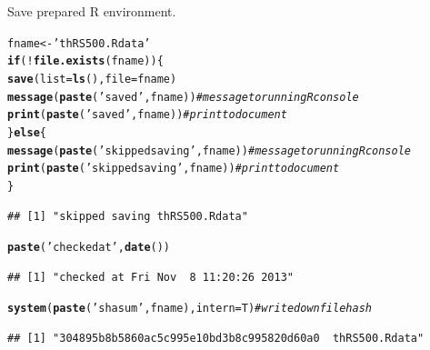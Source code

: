\documentclass{article}\usepackage[]{graphicx}\usepackage[]{color}
\makeatletter
\newcommand{\hlstr}[1]{\textcolor[rgb]{0.192,0.494,0.8}{#1}}%
\newcommand{\hlcom}[1]{\textcolor[rgb]{0.678,0.584,0.686}{\textit{#1}}}%
\newcommand{\hlopt}[1]{\textcolor[rgb]{0,0,0}{#1}}%
\newcommand{\hlstd}[1]{\textcolor[rgb]{0.345,0.345,0.345}{#1}}%
\newcommand{\hlkwa}[1]{\textcolor[rgb]{0.161,0.373,0.58}{\textbf{#1}}}%
\newcommand{\hlkwb}[1]{\textcolor[rgb]{0.69,0.353,0.396}{#1}}%
\newcommand{\hlkwc}[1]{\textcolor[rgb]{0.333,0.667,0.333}{#1}}%
\newcommand{\hlkwd}[1]{\textcolor[rgb]{0.737,0.353,0.396}{\textbf{#1}}}%
\newenvironment{kframe}{%
 \def\at@end@of@kframe{}%
 \ifinner\ifhmode%
  \def\at@end@of@kframe{\end{minipage}}%
  \begin{minipage}{\columnwidth}%
 \fi\fi%
 \def\FrameCommand##1{\hskip\@totalleftmargin \hskip-\fboxsep
 \colorbox{shadecolor}{##1}\hskip-\fboxsep
     \hskip-\linewidth \hskip-\@totalleftmargin \hskip\columnwidth}%
 \MakeFramed {\advance\hsize-\width
   \@totalleftmargin\z@ \linewidth\hsize
   \@setminipage}}%
 {\par\unskip\endMakeFramed%
 \at@end@of@kframe}
\newenvironment{knitrout}{}{} %
\makeatother
\begin{document}
Save prepared R environment.
\begin{knitrout}
\color{fgcolor}\begin{kframe}
\begin{alltt}
\hlstd{fname} \hlkwb{<-} \hlstr{'thRS500.Rdata'}
\hlkwa{if}\hlstd{(}\hlopt{!}\hlkwd{file.exists}\hlstd{(fname)) \{}
   \hlkwd{save}\hlstd{(}\hlkwc{list}\hlstd{=}\hlkwd{ls}\hlstd{(),}\hlkwc{file}\hlstd{=fname)}
   \hlkwd{message}\hlstd{(}\hlkwd{paste}\hlstd{(}\hlstr{'saved'}\hlstd{,fname))}  \hlcom{# message to running R console}
   \hlkwd{print}\hlstd{(}\hlkwd{paste}\hlstd{(}\hlstr{'saved'}\hlstd{,fname))}    \hlcom{# print to document}
\hlstd{\}} \hlkwa{else} \hlstd{\{}
   \hlkwd{message}\hlstd{(}\hlkwd{paste}\hlstd{(}\hlstr{'skipped saving'}\hlstd{,fname))} \hlcom{# message to running R console}
   \hlkwd{print}\hlstd{(}\hlkwd{paste}\hlstd{(}\hlstr{'skipped saving'}\hlstd{,fname))}   \hlcom{# print to document}
\hlstd{\}}
\end{alltt}
\begin{verbatim}
## [1] "skipped saving thRS500.Rdata"
\end{verbatim}
\begin{alltt}
\hlkwd{paste}\hlstd{(}\hlstr{'checked at'}\hlstd{,}\hlkwd{date}\hlstd{())}
\end{alltt}
\begin{verbatim}
## [1] "checked at Fri Nov  8 11:20:26 2013"
\end{verbatim}
\begin{alltt}
\hlkwd{system}\hlstd{(}\hlkwd{paste}\hlstd{(}\hlstr{'shasum'}\hlstd{,fname),}\hlkwc{intern}\hlstd{=T)}  \hlcom{# write down file hash}
\end{alltt}
\begin{verbatim}
## [1] "304895b8b5860ac5c995e10bd3b8c995820d60a0  thRS500.Rdata"
\end{verbatim}
\end{kframe}
\end{knitrout}
\end{document}
